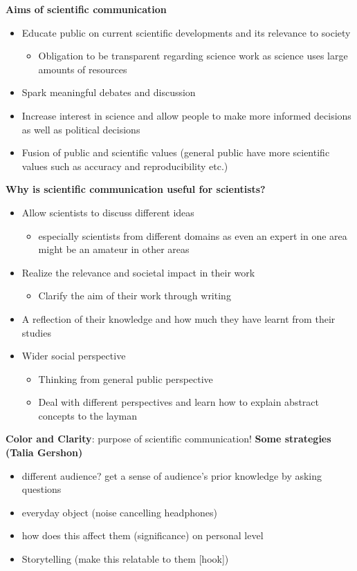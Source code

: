 \documentclass{article}
\begin{document}
\begin{multicols}{2}
\textbf{Aims of scientific communication}
\begin{itemize}
	\item Educate public on current scientific developments and its relevance to society
	\begin{itemize}
		\item Obligation to be transparent regarding science work as science uses large amounts of resources
	\end{itemize}
	\item Spark meaningful debates and discussion
	\item Increase interest in science and allow people to make more informed decisions as well as political decisions
	\item Fusion of public and scientific values (general public have more scientific values such as accuracy and reproducibility etc.)\\
\end{itemize}

\textbf{Why is scientific communication useful for scientists?}
\begin{itemize}
	\item Allow scientists to discuss different ideas
	\begin{itemize}
		\item especially scientists from different domains as even an expert in one area might be an amateur in other areas
	\end{itemize}
	\item Realize the relevance and societal impact in their work
	\begin{itemize}
		\item Clarify the aim of their work through writing
	\end{itemize}
	\item A reflection of their knowledge and how much they have learnt from their studies
	\item Wider social perspective
	\begin{itemize}
		\item Thinking from general public perspective
		\item Deal with different perspectives and learn how to explain abstract concepts to the layman\\
	\end{itemize}
\end{itemize}

\textbf{Color and Clarity}: purpose of scientific communication!
\textbf{Some strategies (Talia Gershon)}
\begin{itemize}
	\item different audience? get a sense of audience's prior knowledge by asking questions
	\item everyday object (noise cancelling headphones)
	\item how does this affect them (significance) on personal level
	\item Storytelling (make this relatable to them [hook])
\end{itemize}


\end{multicols}
\end{document}
